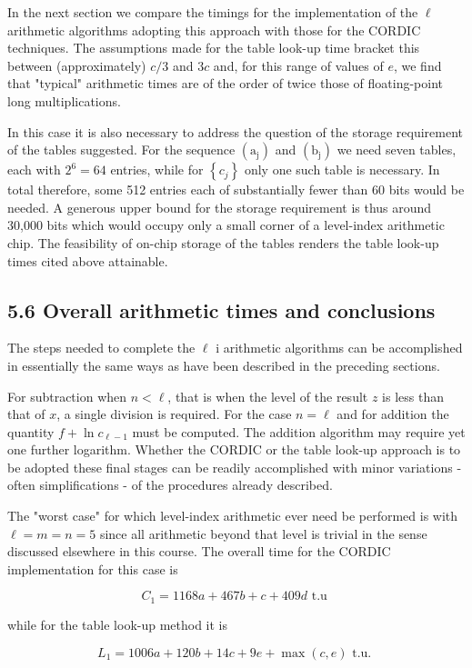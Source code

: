 \documentclass[10pt]{article}
\begin{document}
In the next section we compare the timings for the implementation of the $\ell$ arithmetic algorithms adopting this approach with those for the CORDIC techniques. The assumptions made for the table look-up time bracket this between (approximately) $c / 3$ and $3 c$ and, for this range of values of $e$, we find that "typical" arithmetic times are of the order of twice those of floating-point long multiplications.

In this case it is also necessary to address the question of the storage requirement of the tables suggested. For the sequence $\left(\mathrm{a}_{\mathrm{j}}\right)$ and $\left(\mathrm{b}_{\mathrm{j}}\right)$ we need seven tables, each with $2^{6}=64$ entries, while for $\left\{c_{j}\right\}$ only one such table is necessary. In total therefore, some 512 entries each of substantially fewer than 60 bits would be needed. A generous upper bound for the storage requirement is thus around 30,000 bits which would occupy only a small corner of a level-index arithmetic chip. The feasibility of on-chip storage of the tables renders the table look-up times cited above attainable.

\subsection*{5.6 Overall arithmetic times and conclusions}
The steps needed to complete the $\ell$ i arithmetic algorithms can be accomplished in essentially the same ways as have been described in the preceding sections.

For subtraction when $n<\ell$, that is when the level of the result $z$ is less than that of $x$, a single division is required. For the case $n=\ell$ and for addition the quantity $f+\ln c_{\ell-1}$ must be computed. The addition algorithm may require yet one further logarithm. Whether the CORDIC or the table look-up approach is to be adopted these final stages can be readily accomplished with minor variations - often simplifications - of the procedures already described.

The "worst case" for which level-index arithmetic ever need be performed is with $\ell=m=n=5$ since all arithmetic beyond that level is trivial in the sense discussed elsewhere in this course. The overall time for the CORDIC implementation for this case is

$$
C_{1}=1168 a+467 b+c+409 d \text { t.u }
$$

while for the table look-up method it is

$$
L_{1}=1006 a+120 b+14 c+9 e+\max (c, e) \text { t.u. }
$$
\end{document}
